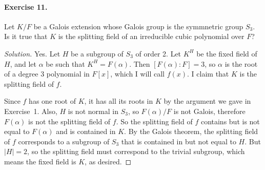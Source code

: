\documentclass{article}
\begin{document}
\paragraph{Exercise 11.} Let $K/F$ be a Galois extension whose Galois
group is the symmnetric group $S_3$. Is it true that $K$ is the
splitting field of an irreducible cubic polynomial over $F$? 

\begin{proof}[Solution]
Yes. Let $H$ be a subgroup of $S_3$ of order 2. Let $K^H$ be the fixed
field of $H$, and let $\alpha$ be such that $K^H=F(\alpha)$. Then
$[F(\alpha):F]=3$, so $\alpha$ is the root of a degree 3 polynomial in
$F[x]$, which I will call $f(x)$. I claim that $K$ is the splitting
field of $f$. 

Since $f$ has one root of $K$, it has all its roots in $K$ by
the argument we gave in Exercise~1. Also, $H$ is not normal in $S_3$,
so $F(\alpha)/F$ is not Galois, therefore $F(\alpha)$ is not the
splitting field of $f$. So the splitting field of $f$ contains but is
not equal to $F(\alpha)$ and is contained in $K$. By the Galois
theorem, the splitting field of $f$ corresponds to a subgroup of $S_3$
that is contained in but not equal to $H$. But $|H|=2$, so the
splitting field must correspond to the trivial subgroup, which means
the fixed field is $K$, as desired.
\end{proof}
\end{document}
